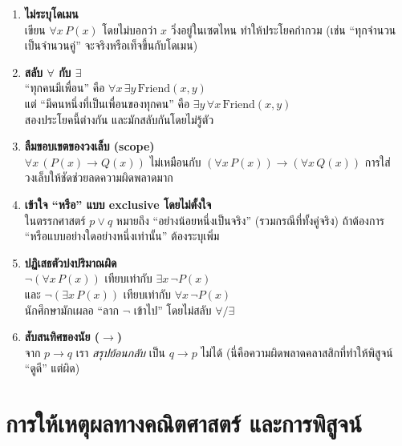 \begin{enumerate}
	\item \textbf{ไม่ระบุโดเมน} \\
	เขียน $\forall x\,P(x)$ โดยไม่บอกว่า $x$ วิ่งอยู่ในเซตไหน ทำให้ประโยคกำกวม
	(เช่น “ทุกจำนวนเป็นจำนวนคู่” จะจริงหรือเท็จขึ้นกับโดเมน)
	
	\item \textbf{สลับ $\forall$ กับ $\exists$} \\
	``ทุกคนมีเพื่อน'' คือ $\forall x\,\exists y\,\mathrm{Friend}(x,y)$ \\
	แต่ ``มีคนหนึ่งที่เป็นเพื่อนของทุกคน'' คือ $\exists y\,\forall x\,\mathrm{Friend}(x,y)$ \\
	สองประโยคนี้ต่างกัน และมักสลับกันโดยไม่รู้ตัว
	
	\item \textbf{ลืมขอบเขตของวงเล็บ (scope)} \\
	$\forall x\,(P(x)\to Q(x))$ ไม่เหมือนกับ $(\forall x\,P(x))\to(\forall x\,Q(x))$
	การใส่วงเล็บให้ชัดช่วยลดความผิดพลาดมาก
	
	\item \textbf{เข้าใจ “หรือ” แบบ exclusive โดยไม่ตั้งใจ} \\
	ในตรรกศาสตร์ $p\lor q$ หมายถึง “อย่างน้อยหนึ่งเป็นจริง” (รวมกรณีที่ทั้งคู่จริง)
	ถ้าต้องการ “หรือแบบอย่างใดอย่างหนึ่งเท่านั้น” ต้องระบุเพิ่ม
	
	\item \textbf{ปฏิเสธตัวบ่งปริมาณผิด} \\
	$\neg(\forall x\,P(x))$ เทียบเท่ากับ $\exists x\,\neg P(x)$ \\
	และ $\neg(\exists x\,P(x))$ เทียบเท่ากับ $\forall x\,\neg P(x)$ \\
	นักศึกษามักเผลอ “ลาก $\neg$ เข้าไป” โดยไม่สลับ $\forall/\exists$
	
	\item \textbf{สับสนทิศของนัย ($\to$)} \\
	จาก $p\to q$ เรา \emph{สรุปย้อนกลับ} เป็น $q\to p$ ไม่ได้
	(นี่คือความผิดพลาดคลาสสิกที่ทำให้พิสูจน์ “ดูดี” แต่ผิด)
\end{enumerate}




\section{การให้เหตุผลทางคณิตศาสตร์ และการพิสูจน์} \label{section:proof}

